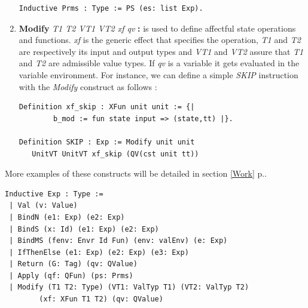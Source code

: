 \begin{enumerate}
\begin{lstlisting}[caption = {Function parameters in the deep embedding},xleftmargin=.05\textwidth,
xrightmargin=.12\textwidth]
Inductive Prms : Type := PS (es: list Exp).     
\end{lstlisting}	
\pagebreak
	\item \textbf{Modify} \textit{T1 T2 VT1 VT2 xf qv} \textbf{:} is used to define affectful state operations and functions. \textit{xf} is the generic effect that specifies the operation, \textit{T1} and \textit{T2} are respectively its input and output types and \textit{VT1} and \textit{VT2} assure that \textit{T1} and \textit{T2} are admissible value types. If \textit{qv} is a variable it gets evaluated in the variable environment. For instance, we can define a simple \textit{SKIP} instruction with the \textit{Modify} construct as follows :
\begin{lstlisting}[caption = {SKIP instruction in the deep embedding},xleftmargin=.02\textwidth,
xrightmargin=.02\textwidth]
Definition xf_skip : XFun unit unit := {|
        b_mod := fun state input => (state,tt) |}.
        
Definition SKIP : Exp := Modify unit unit 
   UnitVT UnitVT xf_skip (QV(cst unit tt))
\end{lstlisting}
\end{enumerate}
More examples of these constructs will be detailed in section \ref{Work} p.\pageref{Work}.
\begin{lstlisting}[caption = {Deep embedding expressions}, label={DeepEmb}]
Inductive Exp : Type :=
 | Val (v: Value)
 | BindN (e1: Exp) (e2: Exp) 
 | BindS (x: Id) (e1: Exp) (e2: Exp)
 | BindMS (fenv: Envr Id Fun) (env: valEnv) (e: Exp)
 | IfThenElse (e1: Exp) (e2: Exp) (e3: Exp) 
 | Return (G: Tag) (qv: QValue)
 | Apply (qf: QFun) (ps: Prms) 
 | Modify (T1 T2: Type) (VT1: ValTyp T1) (VT2: ValTyp T2)
 		(xf: XFun T1 T2) (qv: QValue)
\end{lstlisting}


